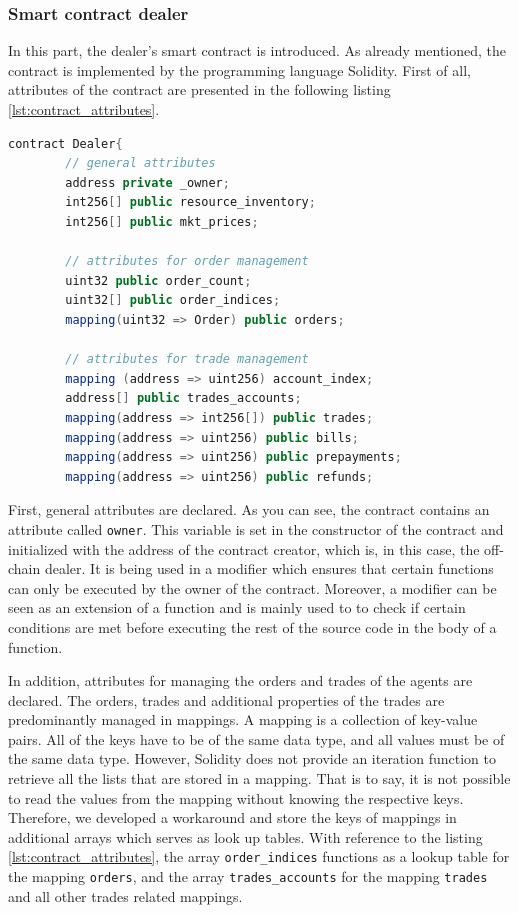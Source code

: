 \subsubsection{Smart contract dealer}
\label{sec:smart_contract_dealer}
In this part, the dealer's smart contract is introduced. 
As already mentioned, the contract is implemented by the programming language Solidity. 
First of all, attributes of the contract are presented in the following listing \ref{lst:contract_attributes}.

\begin{lstlisting}[float=htbp, label=lst:contract_attributes, caption=Attributes of Smart Contract, language=Java]
    contract Dealer{
        // general attributes
        address private _owner;
        int256[] public resource_inventory;
        int256[] public mkt_prices;

        // attributes for order management
        uint32 public order_count;
        uint32[] public order_indices;
        mapping(uint32 => Order) public orders;

        // attributes for trade management
        mapping (address => uint256) account_index; 
        address[] public trades_accounts;
        mapping(address => int256[]) public trades;
        mapping(address => uint256) public bills;
        mapping(address => uint256) public prepayments;
        mapping(address => uint256) public refunds;
\end{lstlisting}

First, general attributes are declared. As you can see, the contract contains an attribute called \verb|owner|.
This variable is set in the constructor of the contract and initialized with the address of the contract creator,
which is, in this case, the off-chain dealer.  
It is being used in a modifier which ensures that certain functions can only be executed by the owner of the contract.
Moreover, a modifier can be seen as an extension of a function and is mainly used to 
to check if certain conditions are met before executing the rest of the source code in the body of a function.

In addition, attributes for managing the orders and trades of the agents are declared. 
The orders, trades and additional properties of the trades are predominantly managed in mappings.
A mapping is a collection of key-value pairs. All of the keys have to be of the same data type, and 
all values must be of the same data type. However, Solidity does not provide an iteration
function to retrieve all the lists that are stored in a mapping. 
That is to say, it is not possible to read the values from the mapping without knowing the respective keys.
Therefore, we developed a workaround and store the keys of mappings in additional arrays which serves 
as look up tables.
With reference to the listing \ref{lst:contract_attributes}, the array \verb|order_indices| functions as a 
lookup table for the mapping \verb|orders|, and the array \verb|trades_accounts| for the mapping 
\verb|trades| and all other trades related mappings.

